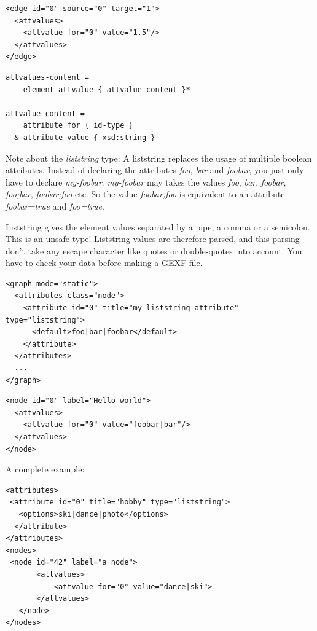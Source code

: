 \documentclass[a4paper,10pt]{article}
\begin{document}
\lstset{ style=gexf }
\begin{lstlisting}[caption={Edge Attributes},label=edgeattributes]
<edge id="0" source="0" target="1">
  <attvalues>
    <attvalue for="0" value="1.5"/>
  </attvalues>
</edge>
\end{lstlisting}

\lstset{ style=rnc }
\begin{lstlisting}[caption={Attribute Values Specification},label=attributeValuesRNC]
attvalues-content =
    element attvalue { attvalue-content }*

attvalue-content =
    attribute for { id-type }
  & attribute value { xsd:string }
\end{lstlisting}

Note about the \textit{liststring} type: A liststring replaces the usage of multiple boolean attributes. Instead of declaring the attributes \textit{foo}, \textit{bar} and \textit{foobar}, you just only have to declare \textit{my-foobar}. \textit{my-foobar} may takes the values \textit{foo}, \textit{bar}, \textit{foobar}, \textit{foo;bar}, \textit{foobar;foo} etc. So the value \textit{foobar;foo} is equivalent to an attribute \textit{foobar=true} and \textit{foo=true}.

Liststring gives the element values separated by a pipe, a comma or a semicolon. This is an unsafe type! Liststring values are therefore parsed, and this parsing don't take any escape character like quotes or double-quotes into account. You have to check your data before making a GEXF file.

\lstset{ style=gexf }
\begin{lstlisting}[caption={Liststring Definition},label=liststringDef]
<graph mode="static">
  <attributes class="node">
    <attribute id="0" title="my-liststring-attribute" type="liststring">
      <default>foo|bar|foobar</default>
    </attribute>
  </attributes>
  ...
</graph>
\end{lstlisting}

\lstset{ style=gexf }
\begin{lstlisting}[caption={Liststring usage},label=liststringUse]
<node id="0" label="Hello world">
  <attvalues>
    <attvalue for="0" value="foobar|bar"/>
  </attvalues>
</node>
\end{lstlisting}

A complete example:

\lstset{ style=gexf }
\begin{lstlisting}[caption={Boolean version},label=boolVersion]
<attributes>
 <attribute id="0" title="hobby" type="liststring">
   <options>ski|dance|photo</options>
  </attribute>
</attributes>
<nodes>
 <node id="42" label="a node">
       <attvalues>
           <attvalue for="0" value="dance|ski">
       </attvalues>
   </node>
</nodes>
\end{lstlisting}
\end{document}

